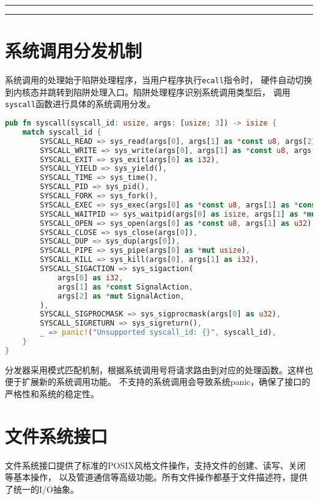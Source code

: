 \noindent
\rule{0.4\textwidth}{0.4pt}
\hfill
{}
\hfill
\rule{0.4\textwidth}{0.4pt}

\section{系统调用分发机制}

系统调用的处理始于陷阱处理程序，当用户程序执行\texttt{ecall}指令时，
硬件自动切换到内核态并跳转到陷阱处理入口。陷阱处理程序识别系统调用类型后，
调用\texttt{syscall}函数进行具体的系统调用分发。

\begin{lstlisting}[language=Rust,caption={系统调用分发器}, label={lst:syscall-dispatcher}]
pub fn syscall(syscall_id: usize, args: [usize; 3]) -> isize {
    match syscall_id {
        SYSCALL_READ => sys_read(args[0], args[1] as *const u8, args[2]),
        SYSCALL_WRITE => sys_write(args[0], args[1] as *const u8, args[2]),
        SYSCALL_EXIT => sys_exit(args[0] as i32),
        SYSCALL_YIELD => sys_yield(),
        SYSCALL_TIME => sys_time(),
        SYSCALL_PID => sys_pid(),
        SYSCALL_FORK => sys_fork(),
        SYSCALL_EXEC => sys_exec(args[0] as *const u8, args[1] as *const usize),
        SYSCALL_WAITPID => sys_waitpid(args[0] as isize, args[1] as *mut i32),
        SYSCALL_OPEN => sys_open(args[0] as *const u8, args[1] as u32),
        SYSCALL_CLOSE => sys_close(args[0]),
        SYSCALL_DUP => sys_dup(args[0]),
        SYSCALL_PIPE => sys_pipe(args[0] as *mut usize),
        SYSCALL_KILL => sys_kill(args[0], args[1] as i32),
        SYSCALL_SIGACTION => sys_sigaction(
            args[0] as i32,
            args[1] as *const SignalAction,
            args[2] as *mut SignalAction,
        ),
        SYSCALL_SIGPROCMASK => sys_sigprocmask(args[0] as u32),
        SYSCALL_SIGRETURN => sys_sigreturn(),
        _ => panic!("Unsupported syscall_id: {}", syscall_id),
    }
}
\end{lstlisting}

分发器采用模式匹配机制，根据系统调用号将请求路由到对应的处理函数。这样也便于扩展新的系统调用功能。
不支持的系统调用会导致系统panic，确保了接口的严格性和系统的稳定性。

\section{文件系统接口}

文件系统接口提供了标准的POSIX风格文件操作，支持文件的创建、读写、关闭等基本操作，
以及管道通信等高级功能。所有文件操作都基于文件描述符，提供了统一的I/O抽象。

